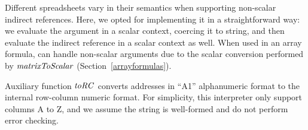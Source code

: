 
Different spreadsheets vary in their semantics when supporting non-scalar
indirect references. Here, we opted for implementing it in a straightforward
way: we evaluate the argument in a scalar context, coercing it to string, and
then evaluate the indirect reference in a scalar context as well. When used in
an array formula,  can handle non-scalar arguments due to the scalar
conversion performed by \ensuremath{\Varid{matrixToScalar}} (Section~\ref{arrayformulas}).

Auxiliary function \ensuremath{\Varid{toRC}} converts addresses in ``A1'' alphanumeric format to
the internal row-column numeric format. For simplicity, this interpreter only
support columns A to Z, and we assume the string is well-formed and do not
perform error checking.


